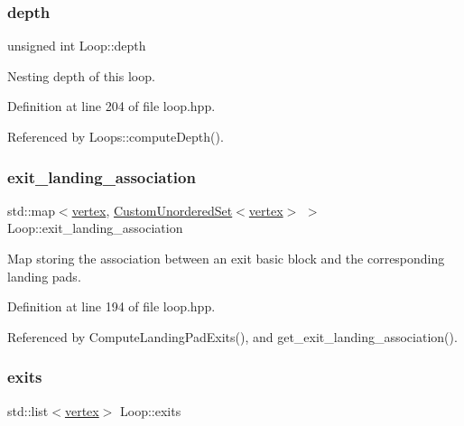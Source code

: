 \subsubsection{\texorpdfstring{depth}{depth}}
{\footnotesize\ttfamily unsigned int Loop\+::depth}



Nesting depth of this loop. 



Definition at line 204 of file loop.\+hpp.



Referenced by Loops\+::compute\+Depth().

\mbox{\label{classLoop_a91daa17db371e729f24f7b3447ece56c}} 
\subsubsection{\texorpdfstring{exit\+\_\+landing\+\_\+association}{exit\_landing\_association}}
{\footnotesize\ttfamily std\+::map$<$\hyperlink{graph_8hpp_abefdcf0544e601805af44eca032cca14}{vertex}, \hyperlink{classCustomUnorderedSet}{Custom\+Unordered\+Set}$<$\hyperlink{graph_8hpp_abefdcf0544e601805af44eca032cca14}{vertex}$>$ $>$ Loop\+::exit\+\_\+landing\+\_\+association\hspace{0.3cm}{\ttfamily [private]}}



Map storing the association between an exit basic block and the corresponding landing pads. 



Definition at line 194 of file loop.\+hpp.



Referenced by Compute\+Landing\+Pad\+Exits(), and get\+\_\+exit\+\_\+landing\+\_\+association().

\mbox{\label{classLoop_a882ea006765bbc1a326e6016ac77dcf1}} 
\subsubsection{\texorpdfstring{exits}{exits}}
{\footnotesize\ttfamily std\+::list$<$\hyperlink{graph_8hpp_abefdcf0544e601805af44eca032cca14}{vertex}$>$ Loop\+::exits\hspace{0.3cm}{\ttfamily [private]}}




